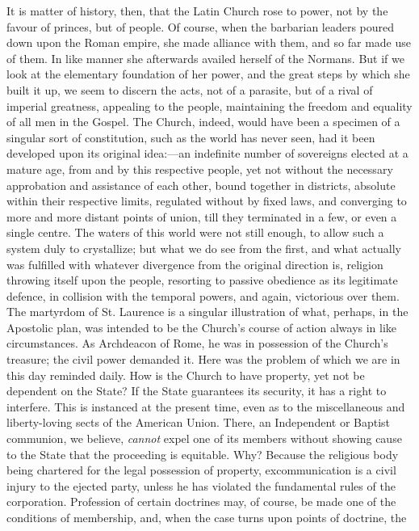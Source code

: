 It is matter of history, then, that the Latin
Church rose to power, not by the favour of princes, but of people. Of
course, when the barbarian leaders poured down upon the Roman empire,
she made alliance with them, and so far made use of them. In
like manner she afterwards availed herself of the Normans. But if we
look at the elementary foundation of her power, and the great steps by
which she built it up, we seem to discern the acts, not of a parasite,
but of a rival of imperial greatness, appealing to the people,
maintaining the freedom and equality of all men in the Gospel. The
Church, indeed, would have been a specimen of a singular sort of
constitution, such as the world has never seen, had it been developed
upon its original idea:—an indefinite number of sovereigns elected
at a mature age, from and by this respective people, yet not without
the necessary approbation and assistance of each other, bound together
in districts, absolute within their respective limits, regulated
without by fixed laws, and converging to more and more distant points
of union, till they terminated in a few, or even a single centre. The
waters of this world were not still enough, to allow such a system
duly to crystallize; but what we do see from the first, and what
actually was fulfilled with whatever divergence from the original
direction is, religion throwing itself upon the people, resorting to
passive obedience as its legitimate defence, in collision with the
temporal powers, and again, victorious over them. The martyrdom of St.
Laurence is a singular illustration of what, perhaps, in the Apostolic
plan, was intended to be the Church's course of action always in like
circumstances. As Archdeacon of Rome, he was in possession of the
Church's treasure; the civil power demanded it. Here was the problem
of which we are in this day reminded daily. How is the Church to have
property, yet not be dependent on the State? If the State guarantees
its security, it has a right to interfere. This is instanced at the
present time, even as to the miscellaneous and liberty-loving sects of
the American Union. There, an Independent or Baptist communion,
we believe, \emph{cannot} expel one of its members without showing
cause to the State that the proceeding is equitable. Why? Because the
religious body being chartered for the legal possession of property,
excommunication is a civil injury to the ejected party, unless he has
violated the fundamental rules of the corporation. Profession of
certain doctrines may, of course, be made one of the conditions of
membership, and, when the case turns upon points of doctrine, the
